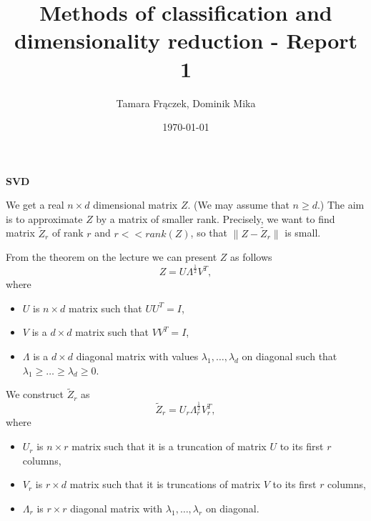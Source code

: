 \documentclass[11pt]{article}
\author{Tamara Frączek, Dominik Mika}
\title{Methods of classification and dimensionality reduction - Report 1}
\date{\today}
\begin{document}
\maketitle

\textbf{SVD}

We get a real $n \times d$ dimensional matrix $Z$.
(We may assume that $n \ge d$.)
The aim is to approximate $Z$ by a matrix of smaller rank.
Precisely, we want to find matrix $\tilde{Z}_r$ of rank $r$ and $r << rank(Z)$, so that $\|Z - \tilde{Z}_r\|$ is small.

From the theorem on the lecture we can present $Z$ as follows
$$Z = U \Lambda^{\frac{1}{2}} V^T,$$
where
\begin{itemize}
    \item $U$ is $n \times d$ matrix such that $U U^T = I$,
    \item $V$ is a $d \times d$ matrix such that $V V^T = I$,
    \item $\Lambda$ is a $d \times d$ diagonal matrix with values $\lambda_1, \dots, \lambda_d$ on diagonal such that $\lambda_1 \ge \dots \ge \lambda_d \ge 0$.
\end{itemize}


We construct $\tilde{Z}_r$ as
$$\tilde{Z}_r = U_r \Lambda_r^{\frac{1}{2}}V_r^T,$$
where
\begin{itemize}
    \item $U_r$ is $n \times r$ matrix such that it is a truncation of matrix $U$ to its first $r$ columns,
    \item $V_r$ is $r \times d$ matrix such that it is truncations of matrix $V$ to its first $r$ columns,
    \item $\Lambda_r$ is $r \times r$ diagonal matrix with $\lambda_1, \dots, \lambda_r$ on diagonal.
\end{itemize}
\end{document}
